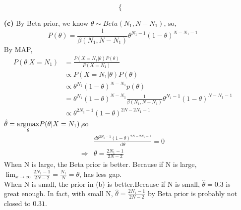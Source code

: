 \documentclass[10pt]{article}
\begin{document}
\begin{enumerate}
$$\begin{cases}
      \end{cases}$$
      \item[\textbf{(c)}]
      By Beta prior, we know $\theta \sim Beta(N_1,N-N_1)$,
      so,$$P(\theta) = \frac{1}{\beta(N_1,N-N_1)}\theta^{N_1-1}(1-\theta)^{N-N_1-1}$$
      By MAP,
      $$
      \begin{aligned}
        P(\theta |X = N_1) &=\frac{P(X=N_1|\theta)P(\theta)}{P(X=N_1)}
        \\&\varpropto P(X=N_1|\theta)P(\theta)
        \\&\varpropto \theta^{N_1}(1-\theta)^{N-N_1}p(\theta)
        \\&=\theta^{N_1}(1-\theta)^{N-N_1}\frac{1}{\beta(N_1,N-N_1)}\theta^{N_1-1}(1-\theta)^{N-N_1-1}
        \\&\varpropto \theta^{2N_1-1}(1-\theta)^{2N-2N_1-1}
      \end{aligned}
      $$
      $\hat{\theta} = \underset{\theta}{\mathop{\rm argmax}}P(\theta|X=N_1)$,so
      $$
      \begin{aligned}
        &\frac{d \theta^{2N_1-1}(1-\theta)^{2N-2N_1-1}}{\mathrm{d}\theta}=0
        \\ \Rightarrow & \theta = \frac{2N_1-1}{2N-2}
      \end{aligned}
      $$
      When N is large, the Beta prior is better. Because if N is large, $\lim_{x\rightarrow \infty}\frac{2N_1-1}{2N-2}=\frac{N_1}{N}=\theta$, has less gap. 
      \\When N is small, the prior in (b) is better.Because if N is small, $\hat{\theta}=0.3$ is great enough. In fact, with small N, $\hat{\theta}=\frac{2N_1-1}{2N-2}$ by Beta prior is probably not closed to $0.31$.
\end{enumerate}

\newpage
\end{document}

